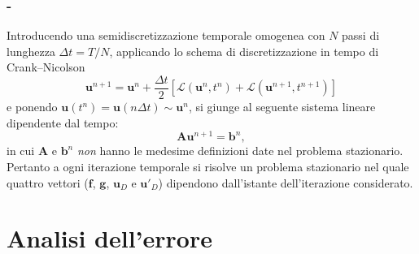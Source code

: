 \documentclass[11pt]{beamer}
\begin{document}
            \begin{frame}\frametitle{\insertpart{} - \insertsection{}}
                Introducendo una semidiscretizzazione temporale omogenea con $N$ passi di lunghezza $\Delta t=T/N$, applicando lo schema di discretizzazione in tempo di Crank–Nicolson
                \begin{equation*}
                    \mathbf u^{n+1}=\mathbf u^n+\frac{\Delta t}{2}
                    \left[\mathcal L(\mathbf u^n,t^n)+\mathcal L(\mathbf u^{n+1},t^{n+1})\right]
                    \label{eqSchemaCrankNicolson}
                \end{equation*}
                e ponendo $\mathbf u(t^n)=\mathbf u(n\Delta t)\sim\mathbf u^n$, si giunge al seguente sistema lineare dipendente dal tempo:
                \begin{equation*}
                    \mathbf A\mathbf u^{n+1}=\mathbf b^n,
                    \label{eqSistemaAlgebricoPE}
                \end{equation*}
                in cui $\mathbf A$ e $\mathbf b^n$ \textit{non} hanno le medesime definizioni date nel problema stazionario. Pertanto a ogni iterazione temporale si risolve un problema stazionario nel quale quattro vettori ($\mathbf f$, $\mathbf g$, $\mathbf u_D$ e $\mathbf u'_D$) dipendono dall'istante dell'iterazione considerato.
            \end{frame}

    
        \section{Analisi dell'errore}
        
\end{document}
